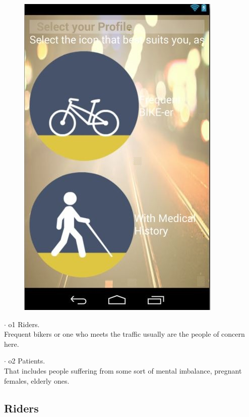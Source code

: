 \begin{figure}


	\centering
	\includegraphics[height=0.35\textheight]{fig01/s_profile}
	\label{fig:RHP01}
    

\end{figure}


    \begin{description}
\item{$\cdot$ o1} Riders. \\
Frequent bikers or one who meets the traffic usually are the people of concern here.
\item{$\cdot$ o2} Patients.\\
 That includes people suffering from some sort of mental imbalance, pregnant females, elderly ones.

\end{description}

\subsection{Riders}
\label{subsec:subsec01}


